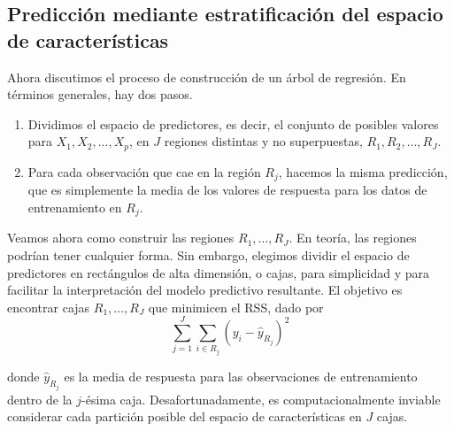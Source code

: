 \subsection{Predicción mediante estratificación del espacio de características}

Ahora discutimos el proceso de construcción de un árbol de regresión. En términos generales,
hay dos pasos.
\begin{enumerate}
\item Dividimos el espacio de predictores, es decir, el conjunto de posibles valores para $X_1, X_2, \ldots, X_p$, en $J$ regiones distintas y no superpuestas, $R_1, R_2, \ldots, R_J$.
\item Para cada observación que cae en la región $R_j$, hacemos la misma predicción, que es simplemente la media de los valores de respuesta para los datos de entrenamiento en $R_j$.
\end{enumerate}

Veamos ahora como construir las regiones $R_1, \ldots, R_J$. En teoría, las regiones podrían tener cualquier forma. Sin embargo, elegimos dividir el espacio de predictores en rectángulos de alta dimensión, o cajas, para simplicidad y para facilitar la interpretación del modelo predictivo resultante. El objetivo es encontrar cajas $R_1, \ldots, R_J$ que minimicen el RSS, dado por
\begin{equation}
\sum_{j=1}^{J} \sum_{i \in R_j} (y_i - \hat{y}_{R_j})^2 
\end{equation}

donde $\hat{y}_{R_j}$ es la media de respuesta para las observaciones de entrenamiento dentro de la $j$-ésima caja. Desafortunadamente, es computacionalmente inviable considerar cada partición posible del espacio de características en $J$ cajas. \\

